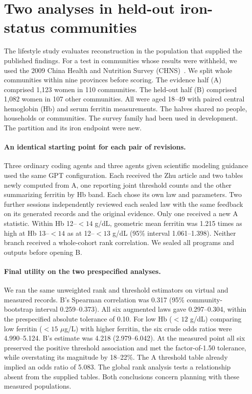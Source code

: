 \documentclass[sigconf,anonymous,review]{acmart}
\begin{document}
\section{Two analyses in held-out iron-status communities}
\label{sec:chns}
The lifestyle study evaluates reconstruction in the population that supplied the published findings. For a test in communities whose results were withheld, we used the 2009 China Health and Nutrition Survey (CHNS)~\cite{chnsbio,chnsind}. We split whole communities within nine provinces before scoring. The evidence half (A) comprised 1,123 women in 110 communities. The held-out half (B) comprised 1,082 women in 107 other communities. All were aged 18--49 with paired central hemoglobin (Hb) and serum ferritin measurements. The halves shared no people, households or communities. The survey family had been used in development. The partition and its iron endpoint were new.

\paragraph{An identical starting point for each pair of revisions.}
Three ordinary coding agents and three agents given scientific modeling guidance used the same GPT configuration. Each received the Zhu article and two tables newly computed from A, one reporting joint threshold counts and the other summarizing ferritin by Hb band. Each chose its own law and parameters. Two further sessions independently reviewed each sealed law with the same feedback on its generated records and the original evidence. Only one received a new A statistic. Within Hb 12--$<14$ g/dL, geometric mean ferritin was 1.215 times as high at Hb 13--$<14$ as at 12--$<13$ g/dL (95\% interval 1.061--1.398). Neither branch received a whole-cohort rank correlation. We sealed all programs and outputs before opening B.

\paragraph{Final utility on the two prespecified analyses.}
We ran the same unweighted rank and threshold estimators on virtual and measured records. B's Spearman correlation was 0.317 (95\% community-bootstrap interval 0.259--0.373). All six augmented laws gave 0.297--0.304, within the prespecified absolute tolerance of 0.10. For low Hb ($<12$ g/dL) comparing low ferritin ($<15$ $\mu$g/L) with higher ferritin, the six crude odds ratios were 4.990--5.124. B's estimate was 4.218 (2.979--6.042). At the measured point all six preserved the positive threshold association and met the factor-of-1.50 tolerance, while overstating its magnitude by 18--22\%. The A threshold table already implied an odds ratio of 5.083. The global rank analysis tests a relationship absent from the supplied tables. Both conclusions concern planning with these measured populations.
\end{document}
